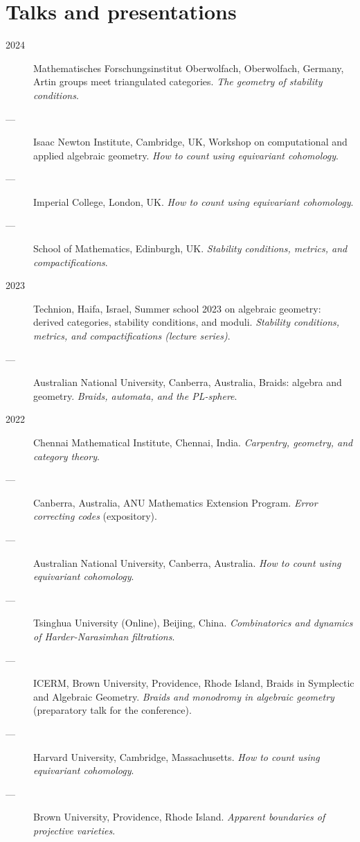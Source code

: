 \documentclass[11pt]{article}
\begin{document}
\section*{Talks and presentations}
\label{sec:org124a7af}
\label{org90fc4e6}
\begin{description}
\item[{2024}] Mathematisches Forschungsinstitut Oberwolfach, Oberwolfach, Germany, Artin groups meet triangulated categories. \emph{The geometry of stability conditions}.
\item[{---}] Isaac Newton Institute, Cambridge, UK, Workshop on computational and applied algebraic geometry. \emph{How to count using equivariant cohomology}.
\item[{---}] Imperial College, London, UK. \emph{How to count using equivariant cohomology}.
\item[{---}] School of Mathematics, Edinburgh, UK. \emph{Stability conditions, metrics, and compactifications}.
\item[{2023}] Technion, Haifa, Israel, Summer school 2023 on algebraic geometry: derived categories, stability conditions, and moduli. \emph{Stability conditions, metrics, and compactifications (lecture series)}.
\item[{---}] Australian National University, Canberra, Australia, Braids: algebra and geometry. \emph{Braids, automata, and the PL-sphere}.
\item[{2022}] Chennai Mathematical Institute, Chennai, India. \emph{Carpentry, geometry, and category theory}.
\item[{---}] Canberra, Australia, ANU Mathematics Extension Program. \emph{Error correcting codes} (expository).
\item[{---}] Australian National University, Canberra, Australia. \emph{How to count using equivariant cohomology}.
\item[{---}] Tsinghua University (Online), Beijing, China. \emph{Combinatorics and dynamics of Harder-Narasimhan filtrations}.
\item[{---}] ICERM, Brown University, Providence, Rhode Island, Braids in Symplectic and Algebraic Geometry. \emph{Braids and monodromy in algebraic geometry} (preparatory talk for the conference).
\item[{---}] Harvard University, Cambridge, Massachusetts. \emph{How to count using equivariant cohomology}.
\item[{---}] Brown University, Providence, Rhode Island. \emph{Apparent boundaries of projective varieties}.

\end{description}
\end{document}
